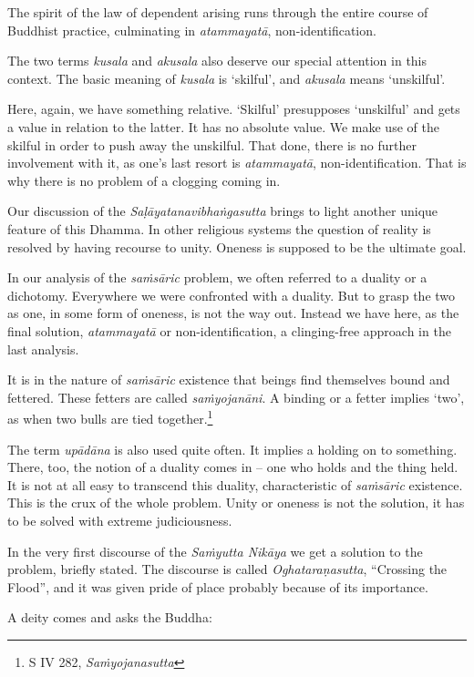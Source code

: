 The spirit of the law of dependent arising runs through the entire course of Buddhist practice, culminating in \emph{atammayatā}, non-identification.

The two terms \emph{kusala} and \emph{akusala} also deserve our special attention in this context. The basic meaning of \emph{kusala} is `skilful', and \emph{akusala} means `unskilful'.

Here, again, we have something relative. `Skilful' presupposes `unskilful' and gets a value in relation to the latter. It has no absolute value. We make use of the skilful in order to push away the unskilful. That done, there is no further involvement with it, as one's last resort is \emph{atammayatā}, non-identification. That is why there is no problem of a clogging coming in.

Our discussion of the \emph{Saḷāyatanavibhaṅgasutta} brings to light another unique feature of this Dhamma. In other religious systems the question of reality is resolved by having recourse to unity. Oneness is supposed to be the ultimate goal.

In our analysis of the \emph{saṁsāric} problem, we often referred to a duality or a dichotomy. Everywhere we were confronted with a duality. But to grasp the two as one, in some form of oneness, is not the way out. Instead we have here, as the final solution, \emph{atammayatā} or non-identification, a clinging-free approach in the last analysis.

It is in the nature of \emph{saṁsāric} existence that beings find themselves bound and fettered. These fetters are called \emph{saṁyojanāni}. A binding or a fetter implies `two', as when two bulls are tied together.\footnote{S IV 282, \emph{Saṁyojanasutta}}

The term \emph{upādāna} is also used quite often. It implies a holding on to something. There, too, the notion of a duality comes in -- one who holds and the thing held. It is not at all easy to transcend this duality, characteristic of \emph{saṁsāric} existence. This is the crux of the whole problem. Unity or oneness is not the solution, it has to be solved with extreme judiciousness.

In the very first discourse of the \emph{Saṁyutta Nikāya} we get a solution to the problem, briefly stated. The discourse is called \emph{Oghataraṇasutta}, ``Crossing the Flood'', and it was given pride of place probably because of its importance.

A deity comes and asks the Buddha:

